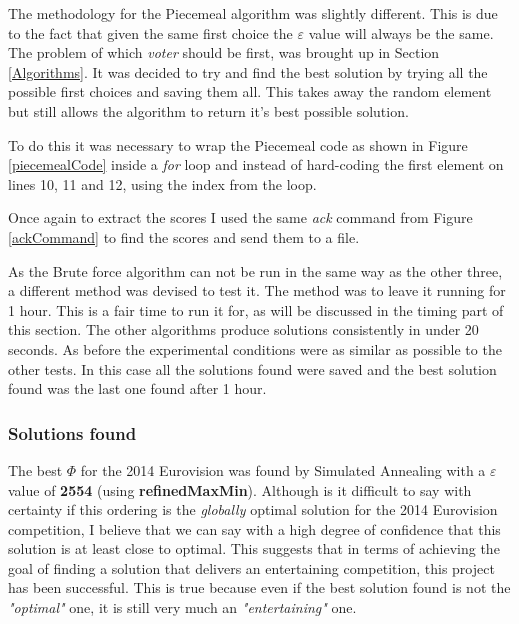 \documentclass[12pt]{report}
\begin{document}
The methodology for the Piecemeal algorithm was slightly different. This is due to the fact that given the same first choice the $\varepsilon$ value will always be the same. The problem of which \textit{voter} should be first, was brought up in Section \ref{Algorithms}. It was decided to try and find the best solution by trying all the possible first choices and saving them all. This takes away the random element but still allows the algorithm to return it's best possible solution.

To do this it was necessary to wrap the Piecemeal code as shown in Figure \ref{piecemealCode} inside a \textit{for} loop and instead of hard-coding the first element on lines 10, 11 and 12, using the index from the loop.

Once again to extract the scores I used the same \textit{ack} command from Figure \ref{ackCommand} to find the scores and send them to a file.

As the Brute force algorithm can not be run in the same way as the other three, a different method was devised to test it. The method was to leave it running for 1 hour. This is a fair time to run it for, as will be discussed in the timing part of this section. The other algorithms produce solutions consistently in under 20 seconds. As before the experimental conditions were as similar as possible to the other tests. In this case all the solutions found were saved and the best solution found was the last one found after 1 hour.


\subsubsection{Solutions found}
The best $\Phi$ for the 2014 Eurovision was found by Simulated Annealing with a $\varepsilon$ value of \textbf{2554} (using \textbf{refinedMaxMin}). Although is it difficult to say with certainty if this ordering is the \textit{globally} optimal solution for the 2014 Eurovision competition, I believe that we can say with a high degree of confidence that this solution is at least close to optimal. This suggests that in terms of achieving the goal of finding a solution that delivers an entertaining competition, this project has been successful. This is true because even if the best solution found is not the \textit{"optimal"} one, it is still very much an \textit{"entertaining"} one.
\end{document}
